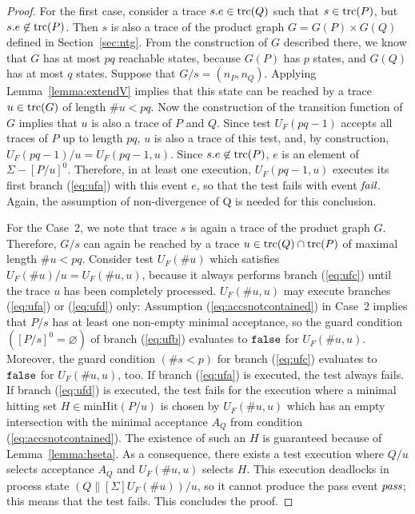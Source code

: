 \begin{proof}
For the first case, consider a  trace $s.e\in\text{trc}(Q)$ such that $s\in\text{trc}(P)$, but 
$s.e\not\in\text{trc}(P)$. Then $s$ is also a trace of the product graph $G = G(P)\times G(Q)$ defined in Section~\ref{sec:ntg}. From the construction of $G$ described there, we know that $G$ has at most $pq$ reachable states, because $G(P)$ has $p$ states, and $G(Q)$ has at most $q$ states. Suppose that $G/s = (n_P,n_Q)$. Applying Lemma~\ref{lemma:extendV} implies that this state can be reached by a trace $u\in\text{trc}(G)$ of length $\#u < pq$. Now the construction of the transition function of $G$ implies that $u$ is also a trace of $P$ and $Q$. Since test $U_F(pq-1)$ accepts all traces of $P$ up to length $pq$, $u$ is also a trace of this test, and, by construction, $U_F(pq-1)/u = U_F(pq-1,u)$. Since $s.e\not\in\text{trc}(P)$,
$e$ is an element of $\Sigma-[P/u]^0$. Therefore, in at least one execution, $U_F(pq-1,u)$ executes its first branch (\ref{eq:ufa}) with this event $e$, so that the test fails with event ${\text{\it fail}}$. Again, the assumption of non-divergence of Q is needed for this conclusion.

For the Case~2, we note that trace $s$ is again a trace of the product graph $G$. Therefore, $G/s$ can again be reached by a trace $u\in\text{trc}(Q)\cap\text{trc}(P)$ of maximal length
$\#u < pq$. Consider test $U_F(\# u)$ which satisfies $U_F(\# u)/u = U_F(\#u,u)$, because
it always performs branch (\ref{eq:ufc}) until the trace $u$ has been completely processed. $U_F(\#u,u)$
  may execute branches (\ref{eq:ufa}) or (\ref{eq:ufd}) only: 
Assumption (\ref{eq:accsnotcontained}) in Case~2 implies that $P/s$ has at least one non-empty minimal acceptance, so the guard condition $([P/s]^0 = \varnothing)$ of branch
 (\ref{eq:ufb}) evaluates to $\mbox{{\tt false}}$ for $U_F(\#u,u)$. Moreover, 
 the guard condition $(\#s < p)$
for branch (\ref{eq:ufc}) evaluates to $\mbox{{\tt false}}$ for $U_F(\#u,u)$, too. 
If branch (\ref{eq:ufa}) is executed, the test always fails. If branch (\ref{eq:ufd})
is executed, the test fails for the execution where a minimal hitting set 
$H\in\text{minHit}(P/u)$ is chosen by $U_F(\#u,u)$ which has an empty intersection
with the minimal acceptance $A_Q$ from condition (\ref{eq:accsnotcontained}). The existence of such an $H$ is guaranteed because of Lemma~\ref{lemma:hseta}. As a consequence, there exists 
a test execution   where $Q/u$ selects acceptance $A_Q$ and  $U_F(\#u,u)$ 
selects $H$. This execution deadlocks in 
process state $(Q\parallel[\Sigma]U_F(\# u))/u$, so it cannot 
produce the pass event ${\text{\it pass}}$; this  means that the test fails. This concludes the proof.
\xbox
\end{proof}



















